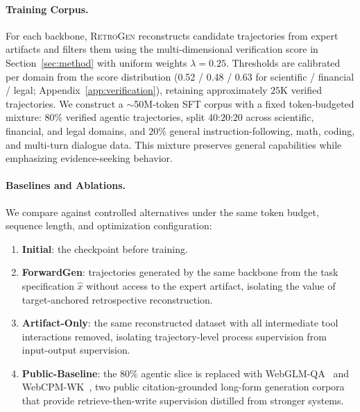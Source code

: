 \paragraph{Training Corpus.}
For each backbone, \textsc{RetroGen} reconstructs candidate trajectories from expert artifacts and filters them using the multi-dimensional verification score in Section~\ref{sec:method} with uniform weights $\lambda=0.25$. Thresholds are calibrated per domain from the score distribution (0.52 / 0.48 / 0.63 for scientific / financial / legal; Appendix~\ref{app:verification}), retaining approximately $25$K verified trajectories. We construct a $\sim$50M-token SFT corpus with a fixed token-budgeted mixture: $80\%$ verified agentic trajectories, split $40$:$20$:$20$ across scientific, financial, and legal domains, and $20\%$ general instruction-following, math, coding, and multi-turn dialogue data. This mixture preserves general capabilities while emphasizing evidence-seeking behavior.

\paragraph{Baselines and Ablations.}
We compare against controlled alternatives under the same token budget, sequence length, and optimization configuration:
\begin{enumerate}[label=(\arabic*), leftmargin=*, topsep=3pt, partopsep=0pt, itemsep=0pt, parsep=3pt]
    \item \textbf{Initial}: the checkpoint before training.
    \item \textbf{ForwardGen}: trajectories generated by the same backbone from the task specification $\hat{x}$ without access to the expert artifact, isolating the value of target-anchored retrospective reconstruction.
    \item \textbf{Artifact-Only}: the same reconstructed dataset with all intermediate tool interactions removed, isolating trajectory-level process supervision from input-output supervision.
    \item \textbf{Public-Baseline}: the $80\%$ agentic slice is replaced with WebGLM-QA~\citep{liu2023webglm} and WebCPM-WK~\citep{qin2023webcpm}, two public citation-grounded long-form generation corpora that provide retrieve-then-write supervision distilled from stronger systems.
\end{enumerate}

